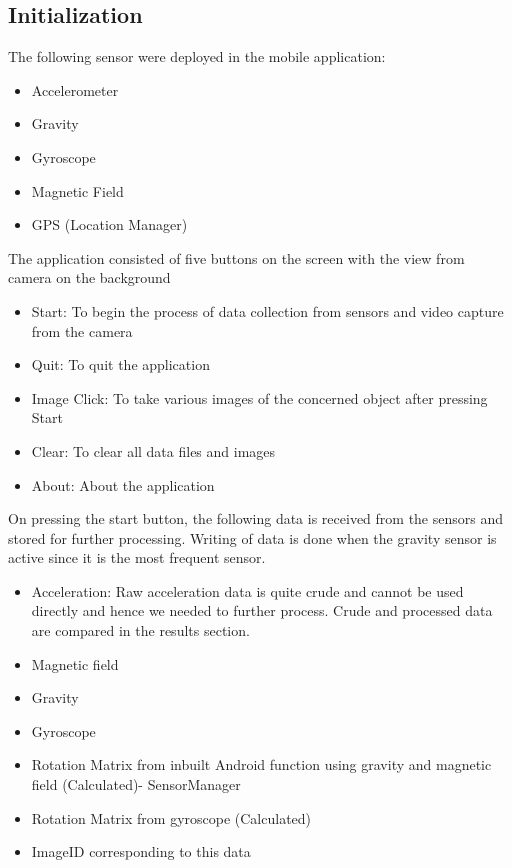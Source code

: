 \documentclass{article}
\begin{document}
		\subsection{Initialization}
			The following sensor were deployed in the mobile application:
				\begin{itemize}
				\item Accelerometer
				\item Gravity
				\item Gyroscope
				\item Magnetic Field
				\item GPS (Location Manager)
				\end{itemize} 
			The application consisted of five buttons on the screen with the view from camera on the background
				\begin{itemize}
				\item Start: To begin the process of data collection from sensors and video capture from the camera
				\item Quit: To quit the application
				\item Image Click: To take various images of the concerned object after pressing Start
				\item Clear: To clear all data files and images
				\item About: About the application
				\end{itemize}
			On pressing the start button, the following data is received from the sensors and stored for further processing. Writing of data is done when the gravity sensor is active since it is the most frequent sensor.
				\begin{itemize}
				\item Acceleration: Raw acceleration data is quite crude and cannot be used directly and hence we needed to further process. Crude and processed data are compared in the results section.
				\item Magnetic field
				\item Gravity
				\item Gyroscope
				\item Rotation Matrix from inbuilt Android function using gravity and magnetic field (Calculated)- SensorManager
				\item Rotation Matrix from gyroscope (Calculated)
				\item ImageID corresponding to this data
				\end{itemize}
\end{document}
